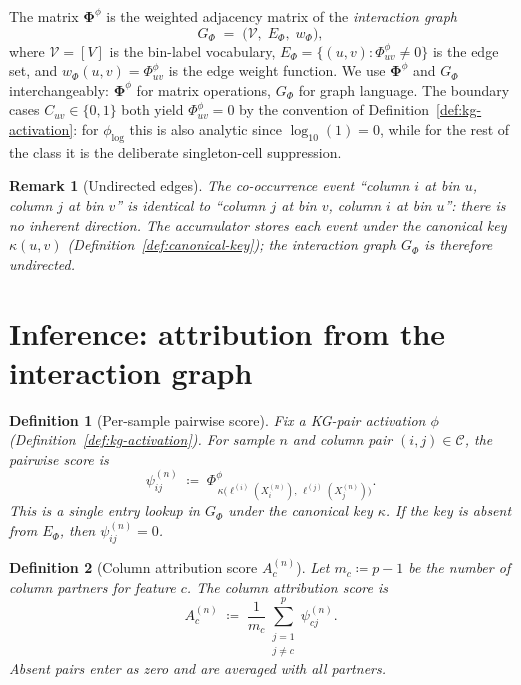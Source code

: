 \documentclass[11pt]{article}
\newtheorem{definition}{Definition}
\newtheorem{remark}{Remark}
\begin{document}
The matrix $\bm{\Phi}^\phi$ is the weighted adjacency matrix of the \emph{interaction graph}
\[
  G_\Phi \;=\; \bigl(\mathcal{V},\; E_\Phi,\; w_\Phi\bigr),
\]
where $\mathcal{V} = [V]$ is the bin-label vocabulary, $E_\Phi = \{(u,v) : \Phi^\phi_{uv} \neq 0\}$ is the edge set, and $w_\Phi(u,v) = \Phi^\phi_{uv}$ is the edge weight function.
We use $\bm{\Phi}^\phi$ and $G_\Phi$ interchangeably: $\bm{\Phi}^\phi$ for matrix operations, $G_\Phi$ for graph language.
The boundary cases $C_{uv} \in \{0, 1\}$ both yield $\Phi^\phi_{uv} = 0$ by the convention of Definition~\ref{def:kg-activation}: for $\phi_{\log}$ this is also analytic since $\log_{10}(1) = 0$, while for the rest of the class it is the deliberate singleton-cell suppression.

\begin{remark}[Undirected edges]
\label{rem:symmetry}
The co-occurrence event ``column $i$ at bin $u$, column $j$ at bin $v$'' is identical to ``column $j$ at bin $v$, column $i$ at bin $u$'': there is no inherent direction.
The accumulator stores each event under the canonical key $\kappa(u,v)$ (Definition~\ref{def:canonical-key}); the interaction graph $G_\Phi$ is therefore undirected.
\end{remark}

\section{Inference: attribution from the interaction graph}
\label{sec:attribution}

\begin{definition}[Per-sample pairwise score]
\label{def:pairwise-score}
Fix a KG-pair activation $\phi$ (Definition~\ref{def:kg-activation}).
For sample $n$ and column pair $(i,j) \in \mathcal{C}$, the \emph{pairwise score} is
\begin{equation}
  \psi_{ij}^{(n)} \;\coloneqq\;
  \Phi^\phi_{\,\kappa\bigl(\ell^{(i)}(X_i^{(n)}),\,\ell^{(j)}(X_j^{(n)})\bigr)}.
  \label{eq:psi}
\end{equation}
This is a single entry lookup in $G_\Phi$ under the canonical key $\kappa$.
If the key is absent from $E_\Phi$, then $\psi_{ij}^{(n)} = 0$.
\end{definition}

\begin{definition}[Column attribution score $A_c^{(n)}$]
\label{def:col-attr}
Let $m_c \coloneqq p - 1$ be the number of column partners for feature $c$.
The \emph{column attribution score} is
\begin{equation}
  A_c^{(n)} \;\coloneqq\;
  \frac{1}{m_c} \sum_{\substack{j=1\\j\neq c}}^{p} \psi_{cj}^{(n)}.
  \label{eq:col-attr}
\end{equation}
Absent pairs enter as zero and are averaged with all partners.
\end{definition}
\end{document}
